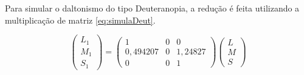 \documentclass[	12pt, Times, openright, twoside, a4paper, english, brazil]{abntex2}
\begin{document}
Para simular o daltonismo do tipo Deuteranopia, a redução é feita utilizando a multiplicação de matriz \ref{eq:simulaDeut}.

\begin{equation}
\left(\begin{array}{ccc}
L_1\\M_1\\S_1
\end{array}\right)
=
\left(\begin{array}{ccc}
1 & 0 & 0 \\
0,494207 & 0 & 1,24827 \\
0 & 0 & 1
\end{array}\right)
\left(\begin{array}{ccc}
L\\M\\S
\end{array}\right)
\label{eq:simulaDeut}
\end{equation}
\end{document}
